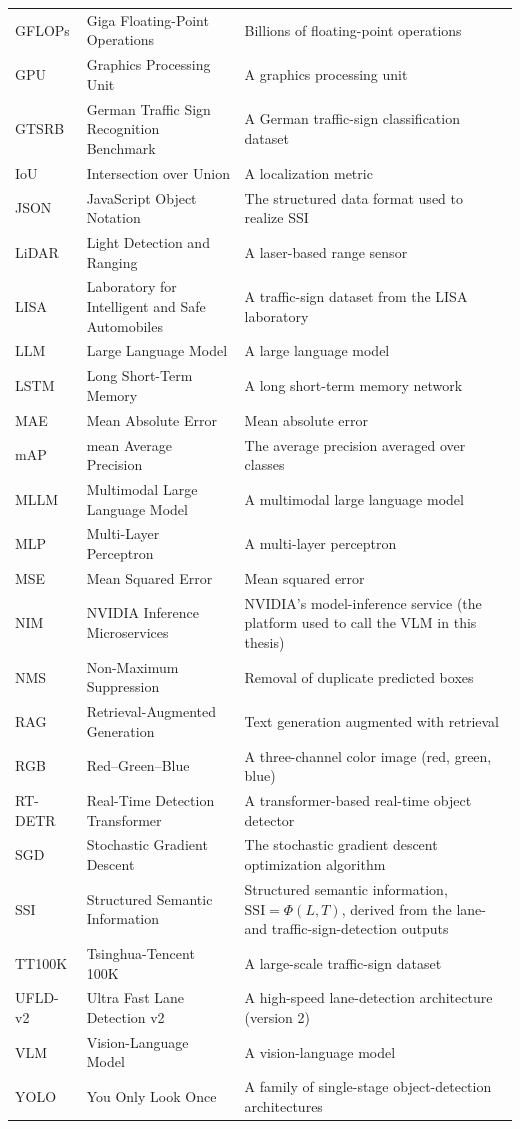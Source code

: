 \documentclass[12pt,a4paper]{report}
\begin{document}
\begin{longtable}{
    >{\RaggedRight\arraybackslash}p{2.7cm}
    >{\RaggedRight\arraybackslash}p{4.2cm}
    >{\RaggedRight\arraybackslash}p{7.0cm}
}
    GFLOPs & Giga Floating-Point Operations & Billions of floating-point operations \\
    GPU & Graphics Processing Unit & A graphics processing unit \\
    GTSRB & German Traffic Sign Recognition Benchmark & A German traffic-sign classification dataset \\
    IoU & Intersection over Union & A localization metric \\
    JSON & JavaScript Object Notation & The structured data format used to realize SSI \\
    LiDAR & Light Detection and Ranging & A laser-based range sensor \\
    LISA & Laboratory for Intelligent and Safe Automobiles & A traffic-sign dataset from the LISA laboratory \\
    LLM & Large Language Model & A large language model \\
    LSTM & Long Short-Term Memory & A long short-term memory network \\
    MAE & Mean Absolute Error & Mean absolute error \\
    mAP & mean Average Precision & The average precision averaged over classes \\
    MLLM & Multimodal Large Language Model & A multimodal large language model \\
    MLP & Multi-Layer Perceptron & A multi-layer perceptron \\
    MSE & Mean Squared Error & Mean squared error \\
    NIM & NVIDIA Inference Microservices & NVIDIA's model-inference service (the platform used to call the VLM in this thesis) \\
    NMS & Non-Maximum Suppression & Removal of duplicate predicted boxes \\
    RAG & Retrieval-Augmented Generation & Text generation augmented with retrieval \\
    RGB & Red--Green--Blue & A three-channel color image (red, green, blue) \\
    RT-DETR & Real-Time Detection Transformer & A transformer-based real-time object detector \\
    SGD & Stochastic Gradient Descent & The stochastic gradient descent optimization algorithm \\
    SSI & Structured Semantic Information & Structured semantic information, $\mathrm{SSI}=\Phi(L,T)$, derived from the lane- and traffic-sign-detection outputs \\
    TT100K & Tsinghua-Tencent 100K & A large-scale traffic-sign dataset \\
    UFLD-v2 & Ultra Fast Lane Detection v2 & A high-speed lane-detection architecture (version 2) \\
    VLM & Vision-Language Model & A vision-language model \\
    YOLO & You Only Look Once & A family of single-stage object-detection architectures \\
\end{longtable}
\end{document}
